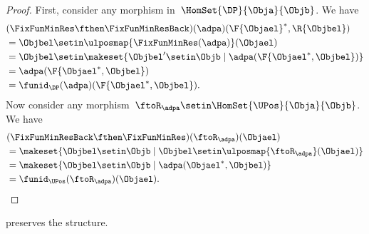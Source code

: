 \begin{proof}
    First, consider any morphism in~$\HomSet{\DP}{\Obja}{\Objb}$.
    We have
    \begin{equation}
        \begin{aligned}
             & (\FixFunMinRes \fthen \FixFunMinResBack)(\adpa)(\F{\Objael}^*,\R{\Objbel}) \\
             & = \Objbel \setin \ulposmap{\FixFunMinRes(\adpa)}(\Objael) \\
             & =\Objbel \setin \makeset{ \Objbel' \setin \Objb \mid \adpa(\F{\Objael^*,\Objbel})} \\
             & =\adpa(\F{\Objael^*,\Objbel}) \\
             & =\funid_\DP(\adpa)(\F{\Objael^*,\Objbel}).
        \end{aligned}
    \end{equation}
    Now consider any morphism~$\ftoR_\adpa \setin \HomSet{\UPos}{\Obja}{\Objb}$.
    We have
    \begin{equation}
        \begin{aligned}
             & (\FixFunMinResBack \fthen \FixFunMinRes)(\ftoR_\adpa)(\Objael) \\
             & =\makeset{ \Objbel \setin \Objb\mid \Objbel \setin \ulposmap{\ftoR_\adpa}(\Objael)} \\
             & =\makeset{ \Objbel \setin \Objb\mid \adpa(\Objael^*,\Objbel)} \\
             & =\funid_\UPos(\ftoR_\adpa)(\Objael).
        \end{aligned}
    \end{equation}

\end{proof}
\begin{lemma}
    \FixFunMinRes preserves the  structure.
\end{lemma}
